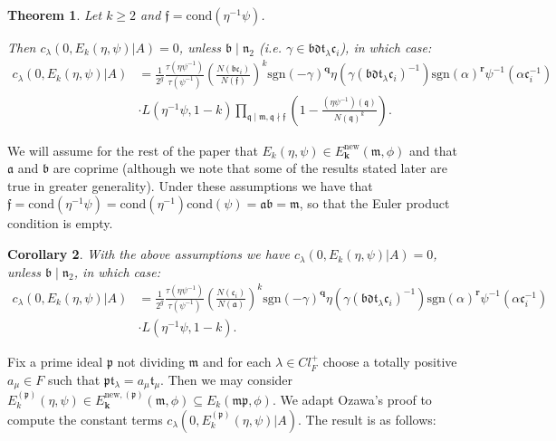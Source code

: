 \documentclass[a4paper,oneside]{amsart}
\theoremstyle{plain}
\newtheorem{thm}{Theorem}[section]
\newtheorem{cor}[thm]{Corollary}
\theoremstyle{definition}
\begin{document}
\begin{thm}
Let $k\geq 2$ and $\mathfrak{f} = \text{cond}(\eta^{-1}\psi)$. 

Then $c_{\lambda}(0,E_k(\eta,\psi)|A) = 0$, unless $\mathfrak{b}\mid\mathfrak{n}_2$ (i.e. $\gamma\in \mathfrak{bdt}_{\lambda}\mathfrak{c}_i$), in which case:
\begin{align*}c_{\lambda}(0,E_k(\eta,\psi)|A) &= \frac{1}{2^g}\frac{\tau(\eta\psi^{-1})}{\tau(\psi^{-1})}\left(\frac{N(\mathfrak{bc}_i)}{N(\mathfrak{f})}\right)^k \text{sgn}(-\gamma)^{\textbf{q}}\eta(\gamma(\mathfrak{bdt}_{\lambda}\mathfrak{c}_i)^{-1})\text{sgn}(\alpha)^{\textbf{r}}\psi^{-1}(\alpha\mathfrak{c}_i^{-1})\\ &\cdot L(\eta^{-1}\psi,1-k)\prod_{\mathfrak{q}\mid\mathfrak{m}, \mathfrak{q}\nmid\mathfrak{f}}\left(1 - \frac{(\eta\psi^{-1})(\mathfrak{q})}{N(\mathfrak{q})^k}\right).\end{align*}
\end{thm}

We will assume for the rest of the paper that $E_k(\eta,\psi)\in E_{\textbf{k}}^{\text{new}}(\mathfrak{m},\phi)$ and that $\mathfrak{a}$ and $\mathfrak{b}$ are coprime (although we note that some of the results stated later are true in greater generality). Under these assumptions we have that $\mathfrak{f} = \text{cond}(\eta^{-1}\psi) = \text{cond}(\eta^{-1})\text{cond}(\psi) = \mathfrak{ab} = \mathfrak{m}$, so that the Euler product condition is empty.

\begin{cor}
With the above assumptions we have $c_{\lambda}(0,E_k(\eta,\psi)|A) = 0$, unless $\mathfrak{b}\mid\mathfrak{n}_2$, in which case: \begin{align*}c_{\lambda}(0,E_k(\eta,\psi)|A) &= \frac{1}{2^g}\frac{\tau(\eta\psi^{-1})}{\tau(\psi^{-1})}\left(\frac{N(\mathfrak{c}_i)}{N(\mathfrak{a})}\right)^k \text{sgn}(-\gamma)^{\textbf{q}}\eta(\gamma(\mathfrak{bdt}_{\lambda}\mathfrak{c}_i)^{-1})\text{sgn}(\alpha)^{\textbf{r}}\psi^{-1}(\alpha\mathfrak{c}_i^{-1})\\ &\cdot L(\eta^{-1}\psi,1-k).\end{align*}
\end{cor}

Fix a prime ideal $\mathfrak{p}$ not dividing $\mathfrak{m}$ and for each $\lambda\in Cl^{+}_F$ choose a totally positive $a_{\mu}\in F$ such that $\mathfrak{p}\mathfrak{t}_{\lambda} = a_{\mu}\mathfrak{t}_{\mu}$. Then we may consider $E^{(\mathfrak{p})}_k(\eta,\psi)\in E_{\textbf{k}}^{\text{new},(\mathfrak{p})}(\mathfrak{m},\phi)\subseteq E_k(\mathfrak{mp},\phi)$. We adapt Ozawa's proof to compute the constant terms $c_{\lambda}(0,E_k^{(\mathfrak{p})}(\eta,\psi)|A)$. The result is as follows:
\end{document}
